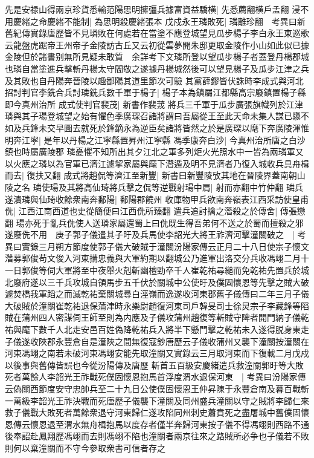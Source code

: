 先是安禄山得兩京珍貨悉輸范陽思明擁彊兵據富資益驕横|{
	先悉薦翻横戶孟翻}
浸不用慶緒之命慶緒不能制|{
	為思明殺慶緒張本}
戊戍永王璘敗死|{
	璘離珍翻　考異曰新舊紀傳實錄唐歷皆不見璘敗在何處若在當塗不應登城望見瓜步楊子李白永王東巡歌云龍盤虎踞帝王州帝子金陵訪古丘又云初從雲夢開朱邸更取金陵作小山如此似已據金陵但於諸書别無所見疑未敢質　余詳考下文璘所登以望瓜步楊子者蓋登丹楊郡城也璘自當塗進兵擊斬丹楊太守閻敬之遂據丹楊城然後可以望見楊子及瓜步江津之兵及其敗也自丹陽奔晉陵以趣鄱陽其道里節次可驗}
其黨薛鏐皆伏誅時李成式與河北招討判官李銑合兵討璘銑兵數千軍于楊子|{
	楊子本為鎮屬江都縣高宗廢鎮置楊子縣即今真州治所}
成式使判官裴茂|{
	新書作裴茙}
將兵三千軍于瓜步廣張旗幟列於江津璘與其子瑒登城望之始有懼色季廣琛召諸將謂曰吾屬從王至此天命未集人謀已隳不如及兵鋒未交早圖去就死於鋒鏑永為逆臣矣諸將皆然之於是廣琛以麾下奔廣陵渾惟明奔江寜|{
	是年以丹楊之江寜縣置昇州江寜縣}
馮季康奔白沙|{
	今真州治所唐之白沙鎮也時屬廣陵郡}
璘憂懼不知所出其夕江北之軍多列炬火光照水中一皆為兩璘軍又以火應之璘以為官軍已濟江遽挈家屬與麾下濳遁及明不見濟者乃復入城收兵具舟楫而去|{
	復扶又翻}
成式將趙侃等濟江至新豐|{
	新書曰新豐陵攷其地在晉陵界蓋南朝山陵之名}
璘使瑒及其將高仙琦將兵擊之侃等逆戰射瑒中肩|{
	射而亦翻中竹仲翻}
璘兵遂潰璘與仙琦收餘衆南奔鄱陽|{
	鄱陽郡饒州}
收庫物甲兵欲南奔嶺表江西采訪使皇甫侁|{
	江西江南西道也史從簡便曰江西侁所臻翻}
遣兵追討擒之濳殺之於傳舍|{
	傳張戀翻}
瑒亦死于亂兵侁使人送璘家屬還蜀上曰侁既生得吾弟何不送之於蜀而擅殺之邪遂廢侁不用　庚子郭子儀遣其子旴及兵馬使李韶光大將王祚濟河擊潼關破之　|{
	考異曰實錄三月朔方節度使郭子儀大破賊于潼關汾陽家傳云正月二十八日使宗子懷文濳募郭俊苟文俊入河東搆忠義與大軍約期以翻城公乃進軍出洛交分兵收馮翊二月十一日郭俊等伺大軍將至中夜舉火剋斬幽檀勁卒千人崔乾祐尋縋而免乾祐先置兵於城北廢府遂以三千兵攻城自領馬步五千伏於關城中公使旴及僕固懷恩等先擊之賊大破遽焚橋我軍蹈之而滅乾祐棄關城尋白涇嶺而逸遂收河東郡舊子儀傳曰二年三月子儀大破賊於潼關崔乾祐退保蒲津時永樂尉趙復河東司戶韓旻司士徐炅宗子李藏鋒等䧟賊在蒲州四人密謀伺王師至則為内應及子儀攻蒲州趙復等斬賊守陴者開門納子儀乾祐與麾下數千人北走安邑百姓偽降乾祐兵入將半下懸門擊之乾祐未入遂得脱身東走子儀遂收陜郡永豐倉自是潼陜之間無復寇鈔唐歷云子儀收蒲州又襲下潼關按潼關在河東馮翊之南若未破河東馮翊安能先取潼關又實錄云三月取河東而下復載二月戊戍以後事與舊傳皆誤也今從汾陽傳及唐歷}
斬首五百級安慶緒遣兵救潼關郭旴等大敗死者萬餘人李韶光王祚戰死僕固懷恩抱馬首浮度渭水退保河東　|{
	考異曰汾陽家傳云偽關西節度安守忠帥兵至二十九日公使僕固懷恩王仲昇陳于永豐倉南及暮百戰斬一萬級李韶光王祚決戰而死唐歷子儀襲下潼關及同州盛兵潼關以守之賊將李歸仁來救子儀戰大敗死者萬餘衆退守河東歸仁遂攻陷同州刺史蕭賁死之盡屠城中舊僕固懷恩傳云懷恩退至渭水無舟楫抱馬以度存者僅半奔歸河東按子儀不得馮翊則西路不通後奉詔赴鳳翔歷馮翊而去則馮翊不陷也潼關者兩京往來之路賊所必争也子儀若不敗則何以棄潼關而不守今參取衆書可信者存之}
